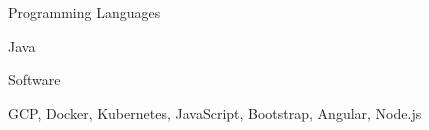 \begin{cventries}
  \cventry
    {Programming Languages}
    {}
    { }
    { }
    {
      \begin{cvitems}
        \item {Java}
      \end{cvitems}
    }
  \cventry
    {Software}
    { }
    { }
    { }
    {
      \begin{cvitems}
        \item {GCP, Docker, Kubernetes, JavaScript, Bootstrap, Angular, Node.js}
      \end{cvitems}
    }
\end{cventries}